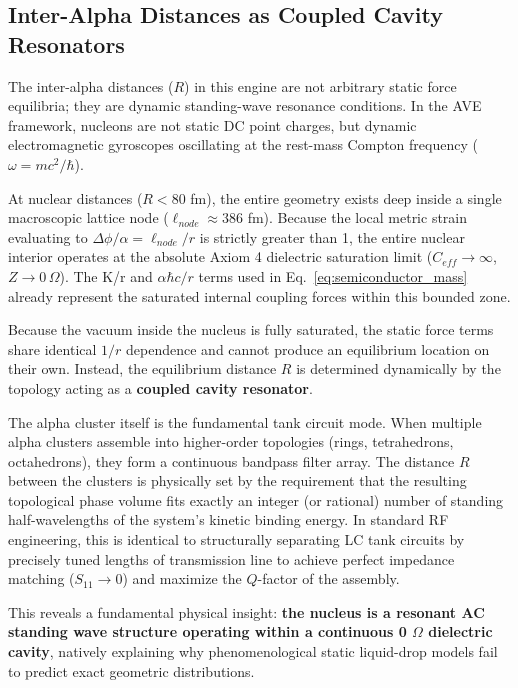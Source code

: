 \subsection{Inter-Alpha Distances as Coupled Cavity Resonators}
\label{sub:R_coupled_cavity}

The inter-alpha distances ($R$) in this engine are not arbitrary static force equilibria; they are dynamic standing-wave resonance conditions. In the AVE framework, nucleons are not static DC point charges, but dynamic electromagnetic gyroscopes oscillating at the rest-mass Compton frequency ($\omega = mc^2/\hbar$).

At nuclear distances ($R < 80$ fm), the entire geometry exists deep inside a single macroscopic lattice node ($\ell_{node} \approx 386$ fm). Because the local metric strain evaluating to $\Delta\phi / \alpha = \ell_{node} / r$ is strictly greater than 1, the entire nuclear interior operates at the absolute Axiom 4 dielectric saturation limit ($C_{eff} \to \infty$, $Z \to 0\,\Omega$). The K/r and $\alpha\hbar c/r$ terms used in Eq.~\ref{eq:semiconductor_mass} already represent the saturated internal coupling forces within this bounded zone.

Because the vacuum inside the nucleus is fully saturated, the static force terms share identical $1/r$ dependence and cannot produce an equilibrium location on their own. Instead, the equilibrium distance $R$ is determined dynamically by the topology acting as a \textbf{coupled cavity resonator}.

The alpha cluster itself is the fundamental tank circuit mode. When multiple alpha clusters assemble into higher-order topologies (rings, tetrahedrons, octahedrons), they form a continuous bandpass filter array. The distance $R$ between the clusters is physically set by the requirement that the resulting topological phase volume fits exactly an integer (or rational) number of standing half-wavelengths of the system's kinetic binding energy. In standard RF engineering, this is identical to structurally separating LC tank circuits by precisely tuned lengths of transmission line to achieve perfect impedance matching ($S_{11} \to 0$) and maximize the $Q$-factor of the assembly.

This reveals a fundamental physical insight: \textbf{the nucleus is a resonant AC standing wave structure operating within a continuous 0 $\Omega$ dielectric cavity}, natively explaining why phenomenological static liquid-drop models fail to predict exact geometric distributions.

